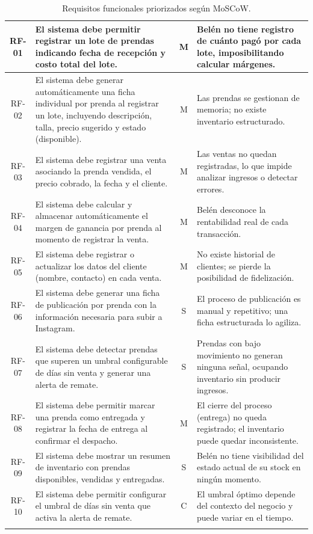\documentclass[11pt,letterpaper]{article}
\begin{document}
\begin{longtable}{|c|p{6.5cm}|c|p{5.5cm}|}
RF-01 & El sistema debe permitir registrar un lote de prendas indicando fecha de recepción y costo total del lote. & M & Belén no tiene registro de cuánto pagó por cada lote, imposibilitando calcular márgenes. \\
\hline
RF-02 & El sistema debe generar automáticamente una ficha individual por prenda al registrar un lote, incluyendo descripción, talla, precio sugerido y estado (disponible). & M & Las prendas se gestionan de memoria; no existe inventario estructurado. \\
\hline
RF-03 & El sistema debe registrar una venta asociando la prenda vendida, el precio cobrado, la fecha y el cliente. & M & Las ventas no quedan registradas, lo que impide analizar ingresos o detectar errores. \\
\hline
RF-04 & El sistema debe calcular y almacenar automáticamente el margen de ganancia por prenda al momento de registrar la venta. & M & Belén desconoce la rentabilidad real de cada transacción. \\
\hline
RF-05 & El sistema debe registrar o actualizar los datos del cliente (nombre, contacto) en cada venta. & M & No existe historial de clientes; se pierde la posibilidad de fidelización. \\
\hline
RF-06 & El sistema debe generar una ficha de publicación por prenda con la información necesaria para subir a Instagram. & S & El proceso de publicación es manual y repetitivo; una ficha estructurada lo agiliza. \\
\hline
RF-07 & El sistema debe detectar prendas que superen un umbral configurable de días sin venta y generar una alerta de remate. & S & Prendas con bajo movimiento no generan ninguna señal, ocupando inventario sin producir ingresos. \\
\hline
RF-08 & El sistema debe permitir marcar una prenda como entregada y registrar la fecha de entrega al confirmar el despacho. & M & El cierre del proceso (entrega) no queda registrado; el inventario puede quedar inconsistente. \\
\hline
RF-09 & El sistema debe mostrar un resumen de inventario con prendas disponibles, vendidas y entregadas. & S & Belén no tiene visibilidad del estado actual de su stock en ningún momento. \\
\hline
RF-10 & El sistema debe permitir configurar el umbral de días sin venta que activa la alerta de remate. & C & El umbral óptimo depende del contexto del negocio y puede variar en el tiempo. \\
\hline
\caption{Requisitos funcionales priorizados según MoSCoW.}
\label{tab:rf}
\end{longtable}
\end{document}

